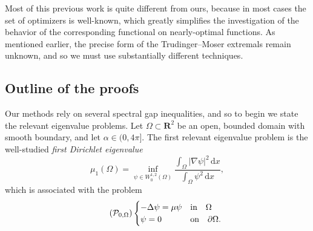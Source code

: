 \documentclass[reqno,11pt]{amsart}
\theoremstyle{definition}
\newcommand{\ud}{\,\mathrm{d}}
\newcommand{\R}{\mathbf{R}}
\begin{document}
Most of this previous work is quite different from ours, because in 
most cases the set of optimizers is well-known, which greatly simplifies 
the investigation of the behavior of the corresponding functional on 
nearly-optimal functions. As mentioned earlier, the precise form of the
Trudinger--Moser extremals remain unknown, and so we must use substantially different techniques. 

\subsection{Outline of the proofs} 
Our methods rely on several spectral gap inequalities, and so to 
begin we state the relevant eigenvalue problems. Let $\Omega \subset 
\R^2$ be an open, bounded domain with smooth boundary, and let 
$\alpha \in (0, 4\pi]$. The first relevant eigenvalue problem is the 
well-studied \emph{first Dirichlet eigenvalue}
\begin{equation}\label{eq:dirichlet_eigenvalue}
    \mu_1(\Omega) = \inf_{\psi \in W^{1,2}_0(\Omega)}\frac{\int_\Omega |\nabla \psi|^2 \ud x}
    {\int_\Omega \psi^2 \ud x },
\end{equation}
which is associated with the problem
\begin{equation}\label{eq:limiting_BVP}\tag{$\mathcal{P}_{0,\Omega}$}
		\begin{cases}
			-\Delta \psi  = \mu  \psi  & \mbox{in} \quad\Omega\\
			\psi=0 & \mbox{on} \quad\partial \Omega.
		\end{cases}    
\end{equation}
\end{document}
